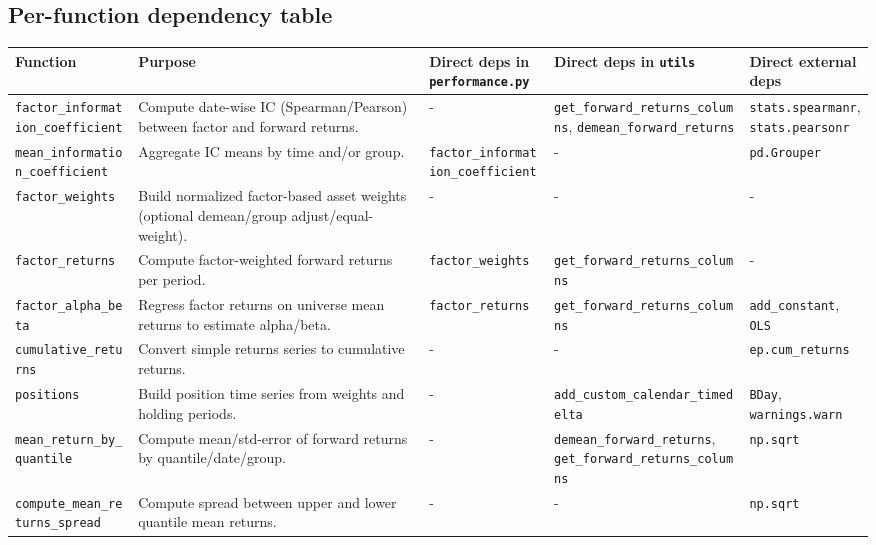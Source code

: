 \documentclass[11pt]{article}
\begin{document}
\subsection{Per-function dependency table}

\small
\renewcommand{\arraystretch}{1.15}
\begin{center}
\begin{tabular}{>{\raggedright\arraybackslash}p{2.8cm} >{\raggedright\arraybackslash}p{3.4cm} >{\raggedright\arraybackslash}p{3.0cm} >{\raggedright\arraybackslash}p{3.2cm} >{\raggedright\arraybackslash}p{2.5cm}}
\toprule
Function & Purpose & Direct deps in \texttt{performance.py} & Direct deps in \texttt{utils} & Direct external deps \\
\midrule
\texttt{factor\_information\_coefficient} & Compute date-wise IC (Spearman/Pearson) between factor and forward returns. & - & \texttt{get\_forward\_returns\_columns}, \texttt{demean\_forward\_returns} & \texttt{stats.spearmanr}, \texttt{stats.pearsonr} \\
\texttt{mean\_information\_coefficient} & Aggregate IC means by time and/or group. & \texttt{factor\_information\_coefficient} & - & \texttt{pd.Grouper} \\
\texttt{factor\_weights} & Build normalized factor-based asset weights (optional demean/group adjust/equal-weight). & - & - & - \\
\texttt{factor\_returns} & Compute factor-weighted forward returns per period. & \texttt{factor\_weights} & \texttt{get\_forward\_returns\_columns} & - \\
\texttt{factor\_alpha\_beta} & Regress factor returns on universe mean returns to estimate alpha/beta. & \texttt{factor\_returns} & \texttt{get\_forward\_returns\_columns} & \texttt{add\_constant}, \texttt{OLS} \\
\texttt{cumulative\_returns} & Convert simple returns series to cumulative returns. & - & - & \texttt{ep.cum\_returns} \\
\texttt{positions} & Build position time series from weights and holding periods. & - & \texttt{add\_custom\_calendar\_timedelta} & \texttt{BDay}, \texttt{warnings.warn} \\
\texttt{mean\_return\_by\_quantile} & Compute mean/std-error of forward returns by quantile/date/group. & - & \texttt{demean\_forward\_returns}, \texttt{get\_forward\_returns\_columns} & \texttt{np.sqrt} \\
\texttt{compute\_mean\_returns\_spread} & Compute spread between upper and lower quantile mean returns. & - & - & \texttt{np.sqrt} \\

\end{tabular}
\end{center}
\end{document}
